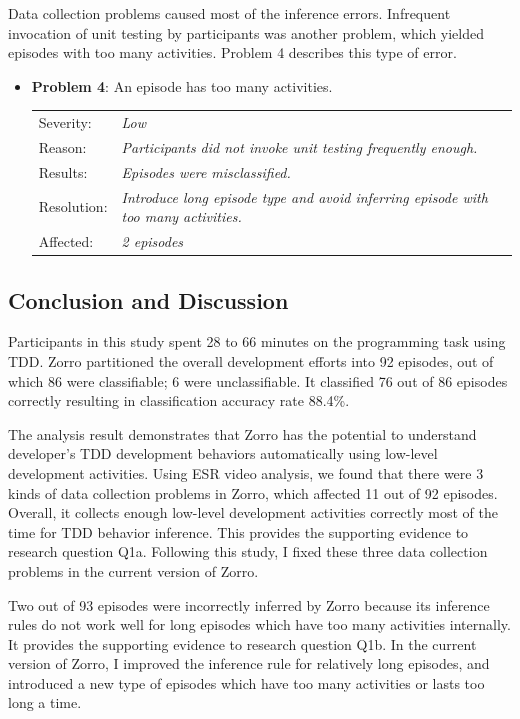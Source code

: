 Data collection problems caused most of the inference errors.
Infrequent invocation of unit testing by participants was another
problem, which yielded episodes with too many activities. Problem 4
describes this type of error.
\begin{itemize}
\item {\textbf{Problem 4}: An episode has too many activities.
  \begin{tabular}{lp{10cm}}
    Severity: & \small\textit{Low}\\
    Reason: & \small\textit{Participants did not invoke unit testing 
              frequently enough.}\\
    Results: & \small\textit{Episodes were misclassified.}\\
    Resolution: & \small\textit{Introduce long episode type and 
                  avoid inferring episode with too many activities.} \\ 
    Affected: & \small\textit{2 episodes}
  \end{tabular}}
\end{itemize}

\subsection{Conclusion and Discussion}

Participants in this study spent 28 to 66 minutes on the
programming task using TDD. Zorro partitioned the overall development
efforts into 92 episodes, out of which 86 were classifiable; 6 were
unclassifiable. It classified 76 out of 86 episodes correctly
resulting in classification accuracy rate 88.4\%.

The analysis result demonstrates that Zorro has the potential to 
understand developer's TDD development behaviors automatically 
using low-level development activities. Using ESR video analysis, we
found that there were 3 kinds of data collection problems in Zorro, 
which affected 11 out of 92 episodes. Overall, it collects enough 
low-level development activities correctly most of the time for TDD 
behavior inference. This provides the supporting evidence to research 
question Q1a. Following this study, I fixed these three data
collection problems in the current version of Zorro.

Two out of 93 episodes were incorrectly inferred by Zorro because its
inference rules do not work well for long episodes which have too many
activities internally. It provides the supporting evidence to research
question Q1b. In the current version of Zorro, I improved the
inference rule for relatively long episodes, and introduced a new type
of episodes which have too many activities or lasts too long a time.

